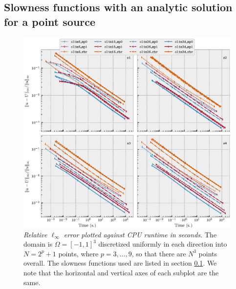 \documentclass[smallcondensed]{svjour3}
\begin{document}
\subsection[Single point source]{Slowness functions with an analytic
  solution for a point source}\label{ssec:point-source-problems}

\begin{figure}
  \centering \includegraphics[width=\linewidth]{time_vs_error_3d.eps}
  \caption{\emph{Relative $\ell_\infty$ error plotted against CPU
      runtime in seconds.} The domain is $\Omega = [-1, 1]^3$
    discretized uniformly in each direction into $N = 2^p + 1$ points,
    where $p = 3, \hdots, 9$, so that there are $N^3$ points
    overall. The slowness functions used are listed in section\@
    \ref{ssec:point-source-problems}. We note that the horizontal and
    vertical axes of each subplot are the
    same.}\label{fig:time-vs-error}
\end{figure}
\end{document}
